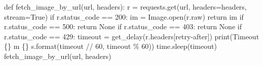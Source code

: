 \documentclass[
  letterpaper,
]{book}
\newenvironment{Shaded}{\begin{snugshade}}{\end{snugshade}}
\newcommand{\BuiltInTok}[1]{\textcolor[rgb]{0.00,0.23,0.31}{#1}}
\newcommand{\ControlFlowTok}[1]{\textcolor[rgb]{0.00,0.23,0.31}{#1}}
\newcommand{\DecValTok}[1]{\textcolor[rgb]{0.68,0.00,0.00}{#1}}
\newcommand{\KeywordTok}[1]{\textcolor[rgb]{0.00,0.23,0.31}{#1}}
\newcommand{\NormalTok}[1]{\textcolor[rgb]{0.00,0.23,0.31}{#1}}
\newcommand{\OperatorTok}[1]{\textcolor[rgb]{0.37,0.37,0.37}{#1}}
\newcommand{\SpecialCharTok}[1]{\textcolor[rgb]{0.37,0.37,0.37}{#1}}
\newcommand{\StringTok}[1]{\textcolor[rgb]{0.13,0.47,0.30}{#1}}
\newcommand{\VariableTok}[1]{\textcolor[rgb]{0.07,0.07,0.07}{#1}}
\begin{document}
\begin{Shaded}
\begin{Highlighting}[]
\KeywordTok{def}\NormalTok{ fetch\_image\_by\_url(url, headers):}
\NormalTok{    r }\OperatorTok{=}\NormalTok{ requests.get(url, headers}\OperatorTok{=}\NormalTok{headers, stream}\OperatorTok{=}\VariableTok{True}\NormalTok{)}
    \ControlFlowTok{if}\NormalTok{ r.status\_code }\OperatorTok{==} \DecValTok{200}\NormalTok{:}
\NormalTok{        im }\OperatorTok{=}\NormalTok{ Image.}\BuiltInTok{open}\NormalTok{(r.raw)}
        \ControlFlowTok{return}\NormalTok{ im}
    \ControlFlowTok{if}\NormalTok{ r.status\_code }\OperatorTok{==} \DecValTok{500}\NormalTok{:}
        \ControlFlowTok{return} \VariableTok{None}
    \ControlFlowTok{if}\NormalTok{ r.status\_code }\OperatorTok{==} \DecValTok{403}\NormalTok{:}
        \ControlFlowTok{return} \VariableTok{None}
    \ControlFlowTok{if}\NormalTok{ r.status\_code }\OperatorTok{==} \DecValTok{429}\NormalTok{:}
\NormalTok{        timeout }\OperatorTok{=}\NormalTok{ get\_delay(r.headers[}\StringTok{\textquotesingle{}retry{-}after\textquotesingle{}}\NormalTok{])}
        \BuiltInTok{print}\NormalTok{(}\StringTok{\textquotesingle{}Timeout }\SpecialCharTok{\{\}}\StringTok{ m }\SpecialCharTok{\{\}}\StringTok{ s\textquotesingle{}}\NormalTok{.}\BuiltInTok{format}\NormalTok{(timeout }\OperatorTok{//} \DecValTok{60}\NormalTok{, timeout }\OperatorTok{\%} \DecValTok{60}\NormalTok{))}
\NormalTok{        time.sleep(timeout)}
\NormalTok{        fetch\_image\_by\_url(url, headers)}


\end{Highlighting}
\end{Shaded}
\end{document}
